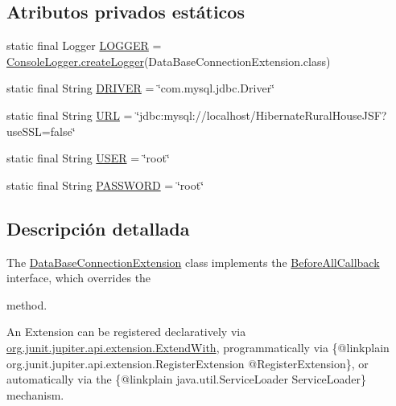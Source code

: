 \subsection*{Atributos privados estáticos}
\begin{DoxyCompactItemize}
\item 
static final Logger \mbox{\hyperlink{classcom_1_1ruralhousejsf_1_1extension_1_1_data_base_connection_extension_a936421171342cb936e683bceb8e819e8}{L\+O\+G\+G\+ER}} = \mbox{\hyperlink{classcom_1_1ruralhousejsf_1_1logger_1_1_console_logger_a520321643663e37d95761134a35505cd}{Console\+Logger.\+create\+Logger}}(Data\+Base\+Connection\+Extension.\+class)
\item 
static final String \mbox{\hyperlink{classcom_1_1ruralhousejsf_1_1extension_1_1_data_base_connection_extension_adbba54504b8c15c35363b8c6ee62772f}{D\+R\+I\+V\+ER}} = \char`\"{}com.\+mysql.\+jdbc.\+Driver\char`\"{}
\item 
static final String \mbox{\hyperlink{classcom_1_1ruralhousejsf_1_1extension_1_1_data_base_connection_extension_aec89224948925eb2f40d169ba4dc00a9}{U\+RL}} = \char`\"{}jdbc\+:mysql\+://localhost/Hibernate\+Rural\+House\+J\+SF?use\+S\+SL=false\char`\"{}
\item 
static final String \mbox{\hyperlink{classcom_1_1ruralhousejsf_1_1extension_1_1_data_base_connection_extension_a87696d6ea7d62869301b08d9264182b0}{U\+S\+ER}} = \char`\"{}root\char`\"{}
\item 
static final String \mbox{\hyperlink{classcom_1_1ruralhousejsf_1_1extension_1_1_data_base_connection_extension_a8b37073a138c653895098f4a0c0f661f}{P\+A\+S\+S\+W\+O\+RD}} = \char`\"{}root\char`\"{}
\end{DoxyCompactItemize}


\subsection{Descripción detallada}
The \mbox{\hyperlink{classcom_1_1ruralhousejsf_1_1extension_1_1_data_base_connection_extension}{Data\+Base\+Connection\+Extension}} class implements the \mbox{\hyperlink{}{Before\+All\+Callback}} interface, which overrides the
\begin{DoxyCode}{0}
\end{DoxyCode}


method. 

An Extension can be registered {\ttfamily declaratively} via \mbox{\hyperlink{}{org.\+junit.\+jupiter.\+api.\+extension.\+Extend\+With}}, {\ttfamily programmatically} via \{@linkplain org.\+junit.\+jupiter.\+api.\+extension.\+Register\+Extension @\+Register\+Extension\}, or {\ttfamily automatically} via the \{@linkplain java.\+util.\+Service\+Loader Service\+Loader\} mechanism.

